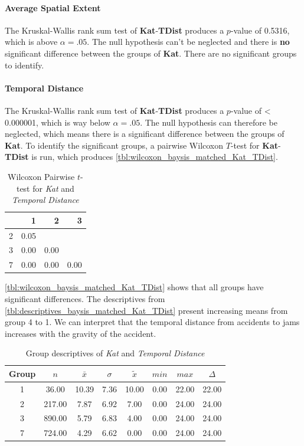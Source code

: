 \paragraph{Average Spatial Extent}
The Kruskal-Wallis rank sum test of \textbf{Kat}-\textbf{TDist} produces a $p$-value of 0.5316, which is above $\alpha=.05$. The null hypothesis can't be neglected and there is \textbf{no} significant difference between the groups of \textbf{Kat}. There are no significant groups to identify.

\paragraph{Temporal Distance}
The Kruskal-Wallis rank sum test of \textbf{Kat}-\textbf{TDist} produces a $p$-value of < 0.000001, which is way below $\alpha=.05$. The null hypothesis can therefore be neglected, which means there is a significant difference between the groups of \textbf{Kat}. To identify the significant groups, a pairwise Wilcoxon $T$-test for \textbf{Kat}-\textbf{TDist} is run, which produces \autoref{tbl:wilcoxon_baysis_matched_Kat_TDist}. 
\begin{table}[ht]
	\small
	\centering
	\begin{tabular}{rrrr}
		\toprule
		& 1 & 2 & 3 \\ 
		\midrule
		2 & 0.05 &  &  \\ 
		3 & 0.00 & 0.00 &  \\ 
		7 & 0.00 & 0.00 & 0.00 \\ 
		\bottomrule
	\end{tabular}
	\caption{Wilcoxon Pairwise $t$-test for \textit{Kat} and \textit{Temporal Distance}}
	\label{tbl:wilcoxon_baysis_matched_Kat_TDist}
\end{table}
\autoref{tbl:wilcoxon_baysis_matched_Kat_TDist} shows that all groups have significant differences. The descriptives from \autoref{tbl:descriptives_baysis_matched_Kat_TDist} present increasing means from group 4 to 1. We can interpret that the temporal distance from accidents to jams increases with the gravity of the accident.
\begin{table}[ht]
	\small
	\centering
	\begin{tabular}{c|c|c|c|c|c|c|c}
	  	\toprule
		Group & $n$ & $\bar{x}$ & $\sigma$ & $\tilde{x}$ & $min$ & $max$ & $\Delta$ \\ 
	  	\midrule
		1 & 36.00 & 10.39 & 7.36 & 10.00 & 0.00 & 22.00 & 22.00 \\ 
	  	2 & 217.00 & 7.87 & 6.92 & 7.00 & 0.00 & 24.00 & 24.00 \\ 
	  	3 & 890.00 & 5.79 & 6.83 & 4.00 & 0.00 & 24.00 & 24.00 \\ 
	  	7 & 724.00 & 4.29 & 6.62 & 0.00 & 0.00 & 24.00 & 24.00 \\ 
	   	\bottomrule
	\end{tabular}
	\caption{Group descriptives of \textit{Kat} and \textit{Temporal Distance}}
	\label{tbl:descriptives_baysis_matched_Kat_TDist}
\end{table}

